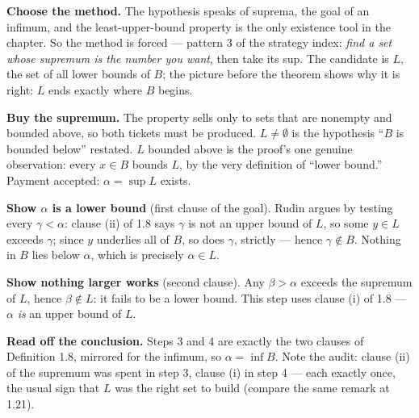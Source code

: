 \begin{proofwalk}
  \item \textbf{Choose the method.} The hypothesis speaks of suprema, the goal
        of an infimum, and the least-upper-bound property is the only
        existence tool in the chapter. So the method is forced --- pattern 3
        of the strategy index: \emph{find a set whose supremum is the number
        you want}, then take its sup. The candidate is $L$, the set of all
        lower bounds of $B$; the picture before the theorem shows why it is
        right: $L$ ends exactly where $B$ begins.
  \item \textbf{Buy the supremum.} The \lub{} property sells only to sets that
        are nonempty and bounded above, so both tickets must be produced.
        $L \ne \emptyset$ is the hypothesis ``$B$ is bounded below''
        restated. $L$ bounded above is the proof's one genuine observation:
        every $x \in B$ bounds $L$, by the very definition of ``lower
        bound.'' Payment accepted: $\alpha = \sup L$ exists.
  \item \textbf{Show $\alpha$ is a lower bound} (first clause of the goal).
        Rudin argues by testing every $\gamma < \alpha$: clause (ii) of 1.8
        says $\gamma$ is not an upper bound of $L$, so some $y \in L$ exceeds
        $\gamma$; since $y$ underlies all of $B$, so does $\gamma$, strictly
        --- hence $\gamma \notin B$. Nothing in $B$ lies below $\alpha$, which
        is precisely $\alpha \in L$.
  \item \textbf{Show nothing larger works} (second clause). Any
        $\beta > \alpha$ exceeds the supremum of $L$, hence $\beta \notin L$:
        it fails to be a lower bound. This step uses clause (i) of 1.8 ---
        $\alpha$ \emph{is} an upper bound of $L$.
  \item \textbf{Read off the conclusion.} Steps 3 and 4 are exactly the two
        clauses of Definition 1.8, mirrored for the infimum, so
        $\alpha = \inf B$. Note the audit: clause (ii) of the supremum was
        spent in step 3, clause (i) in step 4 --- each exactly once, the
        usual sign that $L$ was the right set to build (compare the same
        remark at 1.21).
\end{proofwalk}

